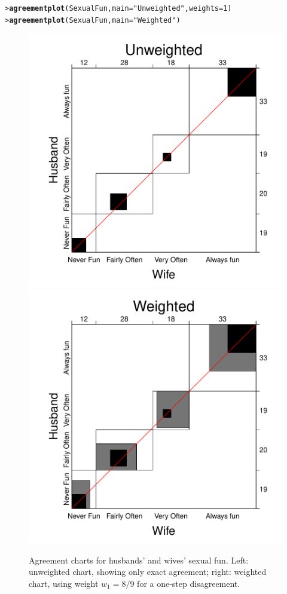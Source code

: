 \documentclass[10pt,krantz2]{krantz}\usepackage[]{graphicx}\usepackage[]{color}
\makeatletter
\newcommand{\hlnum}[1]{\textcolor[rgb]{0.686,0.059,0.569}{#1}}%
\newcommand{\hlstr}[1]{\textcolor[rgb]{0.192,0.494,0.8}{#1}}%
\newcommand{\hlstd}[1]{\textcolor[rgb]{0.345,0.345,0.345}{#1}}%
\newcommand{\hlkwc}[1]{\textcolor[rgb]{0.333,0.667,0.333}{#1}}%
\newcommand{\hlkwd}[1]{\textcolor[rgb]{0.737,0.353,0.396}{\textbf{#1}}}%
\newenvironment{kframe}{%
 \def\at@end@of@kframe{}%
 \ifinner\ifhmode%
  \def\at@end@of@kframe{\end{minipage}}%
  \begin{minipage}{\columnwidth}%
 \fi\fi%
 \def\FrameCommand##1{\hskip\@totalleftmargin \hskip-\fboxsep
 \colorbox{shadecolor}{##1}\hskip-\fboxsep
     \hskip-\linewidth \hskip-\@totalleftmargin \hskip\columnwidth}%
 \MakeFramed {\advance\hsize-\width
   \@totalleftmargin\z@ \linewidth\hsize
   \@setminipage}}%
 {\par\unskip\endMakeFramed%
 \at@end@of@kframe}
\newenvironment{knitrout}{}{} %
\renewenvironment{knitrout}{\small\renewcommand{\baselinestretch}{.85}}{} %
\makeatother
\begin{document}
\begin{knitrout}
\color{fgcolor}\begin{kframe}
\begin{alltt}
\hlstd{> }\hlkwd{agreementplot}\hlstd{(SexualFun,} \hlkwc{main}\hlstd{=}\hlstr{"Unweighted"}\hlstd{,} \hlkwc{weights}\hlstd{=}\hlnum{1}\hlstd{)}
\hlstd{> }\hlkwd{agreementplot}\hlstd{(SexualFun,} \hlkwc{main}\hlstd{=}\hlstr{"Weighted"}\hlstd{)}
\end{alltt}
\end{kframe}\begin{figure}[!htbp]

\centerline{\includegraphics[width=.48\textwidth]{ch04/fig/sexfun-agree-1} 
\includegraphics[width=.48\textwidth]{ch04/fig/sexfun-agree-2} }

\caption[Agreement charts for husbands' and wives' sexual fun]{Agreement charts for husbands' and wives' sexual fun. Left: unweighted chart, showing only exact agreement; right: weighted chart, using weight $w_1 = 8/9$ for a one-step disagreement.\label{fig:sexfun-agree}}
\end{figure}


\end{knitrout}
\end{document}
